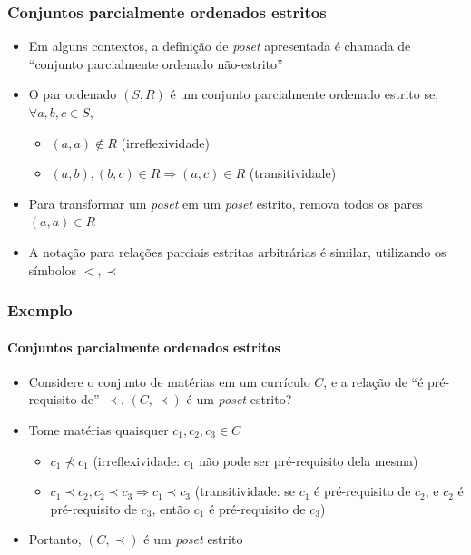 \documentclass[12pt]{beamer}
\begin{document}
\begin{frame}
  \frametitle{Conjuntos parcialmente ordenados estritos}
  \begin{itemize}
    \item Em alguns contextos, a definição de \emph{poset} apresentada é
        chamada de ``conjunto parcialmente ordenado não-estrito''
    \item O par ordenado $(S, R)$ é um conjunto parcialmente ordenado estrito
        se, $\forall a, b, c \in S$,
    \begin{itemize}[itemsep=0pt]
      \item $(a, a) \not\in R$ (irreflexividade)
      \item $(a, b), (b, c) \in R \Rightarrow (a, c) \in R$ (transitividade)
    \end{itemize}
    \item Para transformar um \emph{poset} em um \emph{poset} estrito, remova
      todos os pares $(a, a) \in R$ \item A notação para relações parciais
        estritas arbitrárias é similar, utilizando os símbolos $<, \prec$
  \end{itemize}
\end{frame}

\begin{frame}
  \frametitle{Exemplo}
  \framesubtitle{Conjuntos parcialmente ordenados estritos}
  \begin{itemize}
    \item Considere o conjunto de matérias em um currículo $C$, e a relação de
        ``é pré-requisito de'' $\prec$. $(C, \prec)$ é um \emph{poset} estrito?
    \item Tome matérias quaisquer $c_1, c_2, c_3 \in C$
    \begin{itemize}[itemsep=0pt]
      \item $c_1 \not\prec c_1$ (irreflexividade: $c_1$ não pode ser
          pré-requisito dela mesma)
      \item $c_1 \prec c_2, c_2 \prec c_3 \Rightarrow c_1 \prec c_3$
          (transitividade: se $c_1$ é pré-requisito de $c_2$, e $c_2$ é
            pré-requisito de $c_3$, então $c_1$ é pré-requisito de $c_3$)
    \end{itemize}
    \item Portanto, $(C, \prec)$ é um \emph{poset} estrito
  \end{itemize}
\end{frame}
\end{document}
